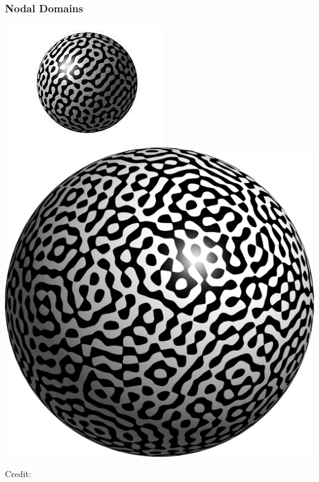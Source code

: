 \documentclass[usenames,dvipsnames,12pt]{beamer}
\begin{document}
\begin{frame}
    \frametitle{Nodal Domains}

    \begin{center}
        \includegraphics[scale=0.6]{lowdegreesphericalharmonic.jpg}
        \hspace{10pt}
        \includegraphics[scale=0.6]{highdegreesphericalharmonic.png}

        \hspace*{10pt}\hbox{\scriptsize Credit:}
    \end{center}



\end{frame}
\end{document}
